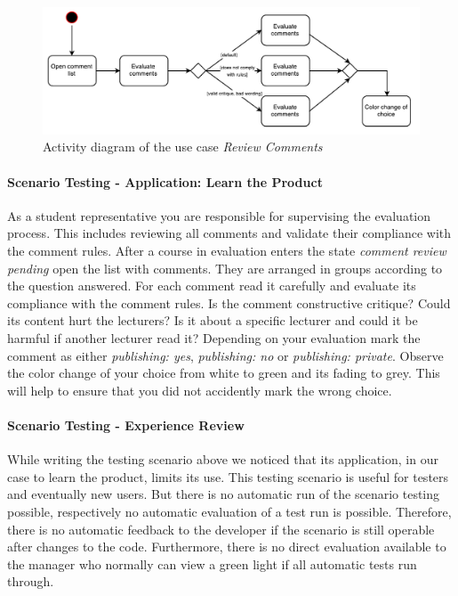 \begin{figure}[h]
    \centering
    \includegraphics[width=\textwidth, keepaspectratio]{graphics/use-case}
    \caption{Activity diagram of the use case \emph{Review Comments}} %
    \label{fig:activity-diagram}
\end{figure}

\paragraph{Scenario Testing - Application: Learn the Product}
As a student representative you are responsible for supervising the evaluation process.
This includes reviewing all comments and validate their compliance with the comment rules.
After a course in evaluation enters the state \emph{comment review pending} open the list with comments.
They are arranged in groups according to the question answered.
For each comment read it carefully and evaluate its compliance with the comment rules.
Is the comment constructive critique? 
Could its content hurt the lecturers? 
Is it about a specific lecturer and could it be harmful if another lecturer read it?
Depending on your evaluation mark the comment as either \emph{publishing: yes}, \emph{publishing: no} or \emph{publishing: private}.
Observe the color change of your choice from white to green and its fading to grey.
This will help to ensure that you did not accidently mark the wrong choice.

\paragraph{Scenario Testing - Experience Review}
While writing the testing scenario above we noticed that its application, in our case to learn the product, limits its use.
This testing scenario is useful for testers and eventually new users.
But there is no automatic run of the scenario testing possible, respectively no automatic evaluation of a test run is possible.
Therefore, there is no automatic feedback to the developer if the scenario is still operable after changes to the code.
Furthermore, there is no direct evaluation available to the manager who normally can view a green light if all automatic tests run through.

